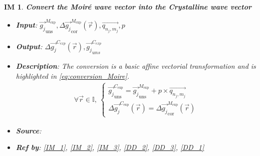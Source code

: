 \documentclass[12pt]{article}
\newtheorem{IM}{IM}
\begin{document}
\begin{IM}
\label{IM_4}
\noindent\colorbox{shadecolorIM}{\normalfont \textbf{Convert the Moir{\'e} wave vector into the Crystalline wave vector}}
\normalfont
\begin{itemize}
\item \textbf{Input}: $\overrightarrow{g_{j}}_{\text{uns}}^{M_{\text{exp}}},\Delta\overrightarrow{g_{j}}_{\text{cor}}^{M_{\text{exp}}}(\vec{r}),\overrightarrow{q_{n_j,m_j}},p$
\item \textbf{Output}: $\Delta \overrightarrow{g_{j}}^{C_{exp}}(\vec{r}),\overrightarrow{g_{j}}_{uns}^{C_{exp}}$
\item \textbf{Description}: The conversion is a basic affine vectorial transformation and is highlighted in \cref{eq:conversion_Moire}.
\begin{equation}
\label{eq:conversion_Moire}
\begin{gathered}
\forall \vec{r} \in \mathbb{I}, \ \begin{cases}
\overrightarrow{g_{j}}_{\text{uns}}^{C_{\text{exp}}}= \overrightarrow{g_{j}}_{\text{uns}}^{M_{\text{exp}}} + p \times \overrightarrow{q_{n_j,m_j}} \\
\Delta \overrightarrow{g_{j}}^{C_{\text{exp}}}(\vec{r})= \Delta\overrightarrow{g_{j}}_{\text{cor}}^{M_{\text{exp}}}(\vec{r})
\end{cases}
\end{gathered}
\end{equation}
\item \textbf{Source}: \cite{Pofelski2017}
\item \textbf{Ref by}: \cref{IM_1}, \cref{IM_2}, \cref{IM_3}, \cref{DD_2}, \cref{DD_3}, \cref{DD_1}
\end{itemize}
\end{IM}
\end{document}
